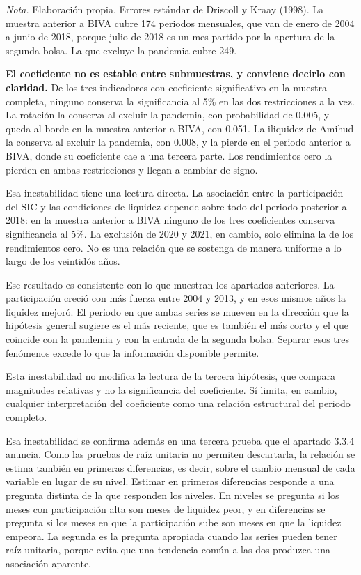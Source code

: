 \emph{Nota.} Elaboración propia. Errores estándar de Driscoll y Kraay (1998). La muestra anterior a BIVA cubre 174 periodos mensuales, que van de enero de 2004 a junio de 2018, porque julio de 2018 es un mes partido por la apertura de la segunda bolsa. La que excluye la pandemia cubre 249.

\textbf{El coeficiente no es estable entre submuestras, y conviene decirlo con claridad.} De los tres indicadores con coeficiente significativo en la muestra completa, ninguno conserva la significancia al 5\% en las dos restricciones a la vez. La rotación la conserva al excluir la pandemia, con probabilidad de 0.005, y queda al borde en la muestra anterior a BIVA, con 0.051. La iliquidez de Amihud la conserva al excluir la pandemia, con 0.008, y la pierde en el periodo anterior a BIVA, donde su coeficiente cae a una tercera parte. Los rendimientos cero la pierden en ambas restricciones y llegan a cambiar de signo.

Esa inestabilidad tiene una lectura directa. La asociación entre la participación del SIC y las condiciones de liquidez depende sobre todo del periodo posterior a 2018: en la muestra anterior a BIVA ninguno de los tres coeficientes conserva significancia al 5\%. La exclusión de 2020 y 2021, en cambio, solo elimina la de los rendimientos cero. No es una relación que se sostenga de manera uniforme a lo largo de los veintidós años.

Ese resultado es consistente con lo que muestran los apartados anteriores. La participación creció con más fuerza entre 2004 y 2013, y en esos mismos años la liquidez mejoró. El periodo en que ambas series se mueven en la dirección que la hipótesis general sugiere es el más reciente, que es también el más corto y el que coincide con la pandemia y con la entrada de la segunda bolsa. Separar esos tres fenómenos excede lo que la información disponible permite.

Esta inestabilidad no modifica la lectura de la tercera hipótesis, que compara magnitudes relativas y no la significancia del coeficiente. Sí limita, en cambio, cualquier interpretación del coeficiente como una relación estructural del periodo completo.

Esa inestabilidad se confirma además en una tercera prueba que el apartado 3.3.4 anuncia. Como las pruebas de raíz unitaria no permiten descartarla, la relación se estima también en primeras diferencias, es decir, sobre el cambio mensual de cada variable en lugar de su nivel. Estimar en primeras diferencias responde a una pregunta distinta de la que responden los niveles. En niveles se pregunta si los meses con participación alta son meses de liquidez peor, y en diferencias se pregunta si los meses en que la participación sube son meses en que la liquidez empeora. La segunda es la pregunta apropiada cuando las series pueden tener raíz unitaria, porque evita que una tendencia común a las dos produzca una asociación aparente.


